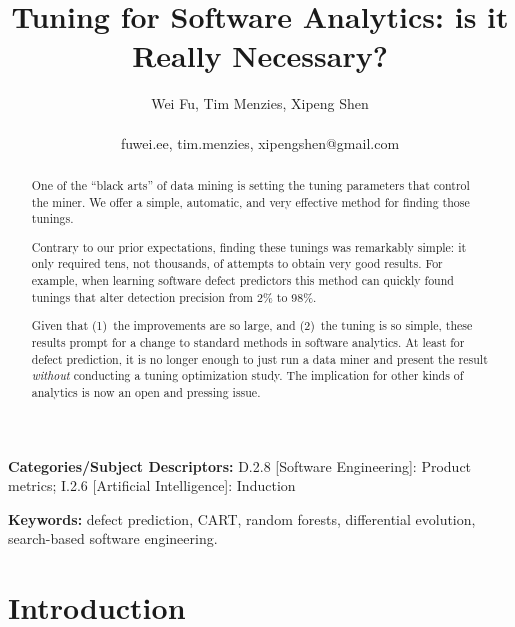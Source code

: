 \documentclass{sig-alternative}
\begin{document}
\title{ Tuning for Software Analytics: is it Really Necessary?}
\author{\alignauthor Wei Fu, Tim Menzies, Xipeng Shen \\
       \\
       fuwei.ee, tim.menzies, xipengshen@gmail.com}
\maketitle 
\thispagestyle{plain}
\pagestyle{plain}
\begin{abstract}
One of the ``black arts'' of data mining is setting the tuning
parameters that control  the miner.  We offer a simple,
automatic, and very effective  method for finding those tunings.

Contrary to our prior expectations, finding these tunings
 was remarkably simple: it only required tens, not thousands, of attempts
 to obtain very good results.
For example, when  learning
software defect predictors this  method can quickly
found tunings  that  alter detection  precision  
 from 2\% to 98\%. 

Given that (1)~the improvements are so large, and (2)~the tuning is so simple,
these results prompt for a change to standard methods in software analytics.
At least for defect prediction, 
it is no longer enough to just run a data miner and present the result
{\em without}  conducting a tuning optimization study.
The implication for other kinds of  analytics is now  an open and pressing issue.


\end{abstract}

\vspace{1mm}
\noindent
{\bf Categories/Subject Descriptors:} 
D.2.8 [Software Engineering]: Product metrics;
I.2.6 [Artificial Intelligence]: Induction

 
\vspace{1mm}
\noindent
{\bf Keywords:} defect prediction, CART, random forests,
differential evolution,
search-based software engineering.

 
 
\section{Introduction}
 
\end{document}
